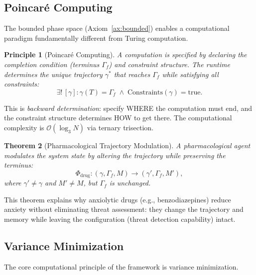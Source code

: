 \documentclass[twocolumn,10pt]{article}
\newtheorem{theorem}{Theorem}[section]
\newtheorem{principle}[theorem]{Principle}
\begin{document}
\subsection{Poincar\'e Computing}

The bounded phase space (Axiom~\ref{ax:bounded}) enables a computational paradigm fundamentally different from Turing computation.

\begin{principle}[Poincar\'e Computing]
\label{princ:poincare}
A computation is specified by declaring the \emph{completion condition} (terminus $\Gamma_{f}$) and constraint structure.  The runtime determines the unique trajectory $\gamma^{*}$ that reaches $\Gamma_{f}$ while satisfying all constraints:
\begin{equation}
  \exists!\,[\gamma] : \gamma(T) = \Gamma_{f} \;\wedge\; \mathrm{Constraints}(\gamma) = \mathrm{true}.
  \label{eq:poincare_computing}
\end{equation}
\end{principle}

This is \emph{backward determination}: specify WHERE the computation must end, and the constraint structure determines HOW to get there.  The computational complexity is $\mathcal{O}(\log_{3} N)$ via ternary trisection.

\begin{theorem}[Pharmacological Trajectory Modulation]
\label{thm:drug}
A pharmacological agent modulates the system state by altering the trajectory while preserving the terminus:
\begin{equation}
  \Phi_{\mathrm{drug}}: (\gamma, \Gamma_{f}, M) \to (\gamma', \Gamma_{f}, M'),
  \label{eq:drug}
\end{equation}
where $\gamma' \neq \gamma$ and $M' \neq M$, but $\Gamma_{f}$ is unchanged.
\end{theorem}

This theorem explains why anxiolytic drugs (e.g., benzodiazepines) reduce anxiety without eliminating threat assessment: they change the trajectory and memory while leaving the configuration (threat detection capability) intact.

\subsection{Variance Minimization}

The core computational principle of the framework is variance minimization.
\end{document}
